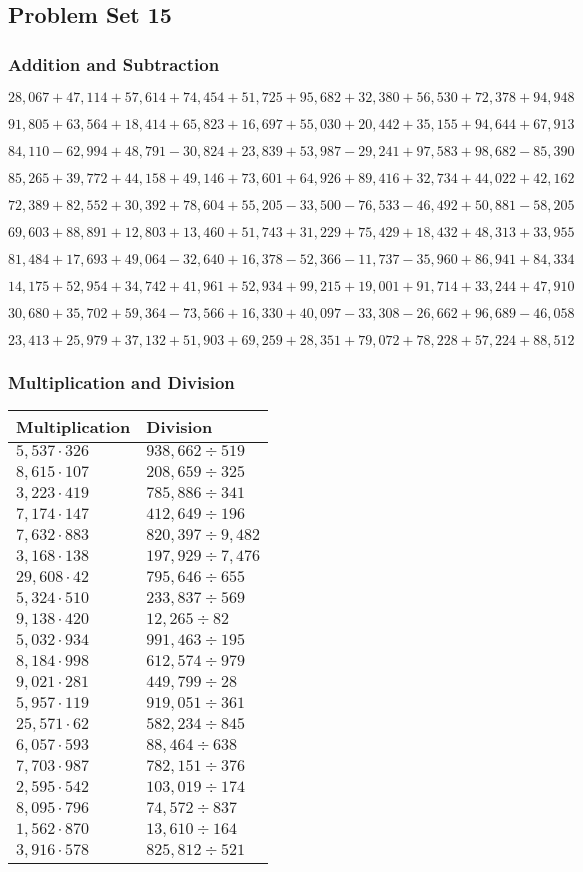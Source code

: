 \hypertarget{problem-set-15-4}{%
\subsection{Problem Set 15}\label{problem-set-15-4}}

\hypertarget{addition-and-subtraction-237}{%
\subsubsection{Addition and
Subtraction}\label{addition-and-subtraction-237}}

\(28,067+47,114+57,614+74,454+51,725+95,682+32,380+56,530+72,378+ 94,948\)

\(91,805+63,564+18,414+65,823+16,697+55,030+20,442+35,155+94,644+67,913\)

\(84,110-62,994+48,791-30,824+23,839+53,987-29,241+97,583+98,682-85,390\)

\(85,265+39,772+44,158+49,146+73,601+64,926+89,416+32,734+44,022+42,162\)

\(72,389+82,552+30,392+78,604+55,205-33,500-76,533-46,492+50,881-58,205\)

\(69,603+88,891+12,803+13,460+51,743+31,229+75,429+18,432+48,313+33,955\)

\(81,484+17,693+49,064-32,640+16,378-52,366-11,737-35,960+86,941+84,334\)

\(14,175+52,954+34,742+41,961+52,934+99,215+19,001+91,714+33,244+47,910\)

\(30,680+35,702+59,364-73,566+16,330+40,097-33,308-26,662+96,689-46,058\)

\(23,413+25,979+37,132+51,903+69,259+28,351+79,072+78,228+57,224+88,512\)

\hypertarget{multiplication-and-division-236}{%
\subsubsection{Multiplication and
Division}\label{multiplication-and-division-236}}

\begin{longtable}[]{@{}ll@{}}
\toprule
Multiplication & Division\tabularnewline
\midrule
\endhead
\(5,537\cdot326\) & \(938,662÷519\)\tabularnewline
\(8,615\cdot107\) & \(208,659÷325\)\tabularnewline
\(3,223\cdot419\) & \(785,886÷341\)\tabularnewline
\(7,174\cdot147\) & \(412,649÷196\)\tabularnewline
\(7,632\cdot883\) & \(820,397÷9,482\)\tabularnewline
\(3,168\cdot138\) & \(197,929÷7,476\)\tabularnewline
\(29,608\cdot42\) & \(795,646÷655\)\tabularnewline
\(5,324\cdot510\) & \(233,837÷569\)\tabularnewline
\(9,138\cdot420\) & \(12,265÷82\)\tabularnewline
\(5,032\cdot934\) & \(991,463÷195\)\tabularnewline
\(8,184\cdot998\) & \(612,574÷979\)\tabularnewline
\(9,021\cdot281\) & \(449,799÷28\)\tabularnewline
\(5,957\cdot119\) & \(919,051÷361\)\tabularnewline
\(25,571\cdot62\) & \(582,234÷845\)\tabularnewline
\(6,057\cdot593\) & \(88,464÷638\)\tabularnewline
\(7,703\cdot987\) & \(782,151÷376\)\tabularnewline
\(2,595\cdot542\) & \(103,019÷174\)\tabularnewline
\(8,095\cdot796\) & \(74,572÷837\)\tabularnewline
\(1,562\cdot870\) & \(13,610÷164\)\tabularnewline
\(3,916\cdot578\) & \(825,812÷521\)\tabularnewline
\bottomrule
\end{longtable}

